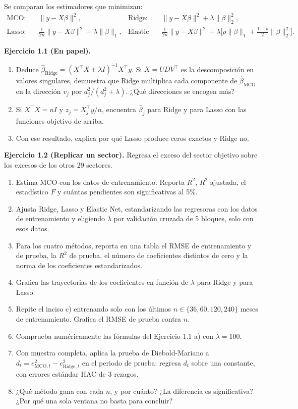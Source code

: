 \documentclass[11pt,letterpaper]{article}
\newcommand{\norm}[1]{\lVert #1\rVert}
\newcommand{\ejercicio}[1]{\par\medskip\textbf{Ejercicio #1.}\space}
\begin{document}
Se comparan los estimadores que minimizan:
\begin{align*}
\text{MCO:}\quad & \norm{y-X\beta}^2, &
\text{Ridge:}\quad & \norm{y-X\beta}^2+\lambda\norm{\beta}_2^2,\\
\text{Lasso:}\quad & \tfrac{1}{2n}\norm{y-X\beta}^2+\lambda\norm{\beta}_1, &
\text{Elastic Net:}\quad & \tfrac{1}{2n}\norm{y-X\beta}^2+\lambda\bigl[\rho\norm{\beta}_1+\tfrac{1-\rho}{2}\norm{\beta}_2^2\bigr].
\end{align*}

\ejercicio{1.1 (En papel)}
\begin{enumerate}
  \item Deduce $\hat\beta_{\text{Ridge}}=(X^\top X+\lambda I)^{-1}X^\top y$. Si $X=UDV^\top$ es la descomposición en valores singulares, demuestra que Ridge multiplica cada componente de $\hat\beta_{\text{MCO}}$ en la dirección $v_j$ por $d_j^2/(d_j^2+\lambda)$. ¿Qué direcciones se encogen más?
  \item Si $X^\top X=nI$ y $z_j=X_j^\top y/n$, encuentra $\hat\beta_j$ para Ridge y para Lasso con las funciones objetivo de arriba.
  \item Con ese resultado, explica por qué Lasso produce ceros exactos y Ridge no.
\end{enumerate}

\ejercicio{1.2 (Replicar un sector)} Regresa el exceso del sector objetivo sobre los excesos de los otros 29 sectores.
\begin{enumerate}
  \item Estima MCO con los datos de entrenamiento. Reporta $R^2$, $R^2$ ajustada, el estadístico $F$ y cuántas pendientes son significativas al 5\%.
  \item Ajusta Ridge, Lasso y Elastic Net, estandarizando las regresoras con los datos de entrenamiento y eligiendo $\lambda$ por validación cruzada de 5 bloques, solo con esos datos.
  \item Para los cuatro métodos, reporta en una tabla el RMSE de entrenamiento y de prueba, la $R^2$ de prueba, el número de coeficientes distintos de cero y la norma de los coeficientes estandarizados.
  \item Grafica las trayectorias de los coeficientes en función de $\lambda$ para Ridge y para Lasso.
  \item Repite el inciso c) entrenando solo con los últimos $n\in\{36,60,120,240\}$ meses de entrenamiento. Grafica el RMSE de prueba contra $n$.
  \item Comprueba numéricamente las fórmulas del Ejercicio 1.1 a) con $\lambda=100$.
  \item Con muestra completa, aplica la prueba de Diebold-Mariano a $d_t=e_{\text{MCO},t}^2-e_{\text{Ridge},t}^2$ en el periodo de prueba: regresa $d_t$ sobre una constante, con errores estándar HAC de 3 rezagos.
  \item ¿Qué método gana con cada $n$, y por cuánto? ¿La diferencia es significativa? ¿Por qué una sola ventana no basta para concluir?
\end{enumerate}
\end{document}

